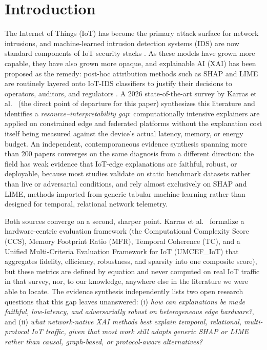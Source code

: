 \section{Introduction}\label{introduction}

The Internet of Things (IoT) has become the primary attack surface for network intrusions, and machine-learned intrusion detection systems (IDS) are now standard components of IoT security stacks \citep{ref1,ref2}. As these models have grown more capable, they have also grown more opaque, and explainable AI (XAI) has been proposed as the remedy: post-hoc attribution methods such as SHAP \citep{ref3} and LIME \citep{ref4} are routinely layered onto IoT-IDS classifiers to justify their decisions to operators, auditors, and regulators \citep{ref5,ref6}. A 2026 state-of-the-art survey by Karras et al.~\citep{ref1} (the direct point of departure for this paper) synthesizes this literature and identifies a \emph{resource--interpretability gap}: computationally intensive explainers are applied on constrained edge and federated platforms without the explanation cost itself being measured against the device's actual latency, memory, or energy budget. An independent, contemporaneous evidence synthesis spanning more than 200 papers \citep{ref7} converges on the same diagnosis from a different direction: the field has weak evidence that IoT-edge explanations are faithful, robust, or deployable, because most studies validate on static benchmark datasets rather than live or adversarial conditions, and rely almost exclusively on SHAP and LIME, methods imported from generic tabular machine learning rather than designed for temporal, relational network telemetry.

Both sources converge on a second, sharper point. Karras et al.~\citep{ref1} formalize a hardware-centric evaluation framework (the Computational Complexity Score (CCS), Memory Footprint Ratio (MFR), Temporal Coherence (TC), and a Unified Multi-Criteria Evaluation Framework for IoT (UMCEF\_IoT) that aggregates fidelity, efficiency, robustness, and sparsity into one composite score), but these metrics are defined by equation and never computed on real IoT traffic in that survey, nor, to our knowledge, anywhere else in the literature we were able to locate. The evidence synthesis \citep{ref7} independently lists two open research questions that this gap leaves unanswered: (i) \emph{how can explanations be made faithful, low-latency, and adversarially robust on heterogeneous edge hardware?}, and (ii) \emph{what network-native XAI methods best explain temporal, relational, multi-protocol IoT traffic, given that most work still adapts generic SHAP or LIME rather than causal, graph-based, or protocol-aware alternatives?}

